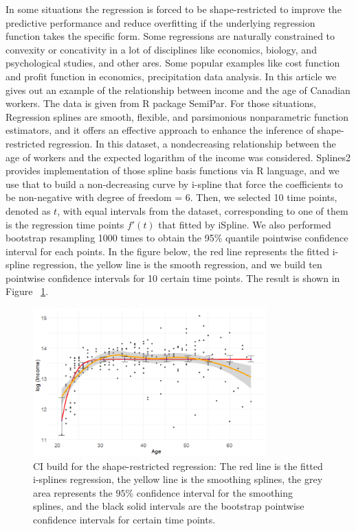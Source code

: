 \documentclass[12pt]{article}
\begin{document}
In some situations the regression is forced to be shape-restricted to improve the predictive performance and reduce overfitting if the underlying regression function takes the specific form. Some regressions are naturally constrained to convexity or concativity in a lot of disciplines like economics, biology, and psychological studies, and other ares.\cite{jieying2022heteroscedastic} \cite{guntuboyina2018nonparametric} Some popular examples like cost function and profit function in economics\cite{gallant1984imposing}, precipitation data analysis\cite{molitor2002bayesian}. In this article we gives out an example of the relationship between income and the age of Canadian workers. The data is given from R package SemiPar. For those situations, Regression splines are smooth, flexible, and parsimonious nonparametric function estimators, and it offers an effective approach to enhance the inference of shape-restricted regression. \cite{meyer2008inference} In this dataset, a nondecreasing relationship between the age of workers and the expected logarithm of the income was considered. \cite{wang2021shape}  Splines2 provides implementation of those spline basis functions via R language, and we use that to build a non-decreasing curve by i-spline that force the coefficients to be non-negative with degree of freedom = 6. Then, we selected 10 time points, denoted as $t$, with equal intervals from the dataset, corresponding to one of them is the regression time points \(f'(t)\) that fitted by iSpline. We also performed bootstrap resampling 1000 times to obtain the 95\% quantile pointwise confidence interval for each points. In the figure below, the red line represents the fitted i-spline regression, the yellow line is the smooth regression, and we build ten pointwise confidence intervals for 10 certain time points. The result is shown in Figure ~\ref{fig:semipar}.


\begin{figure}[H]
  \centering
  \includegraphics[width=0.8\textwidth]{SemiparCI.png}
  \caption{CI build for the shape-restricted regression: The red line is the fitted i-splines regression, the yellow line is the smoothing splines, the grey area represents the \(95\%\) confidence interval for the smoothing splines, and the black solid intervals are the bootstrap pointwise confidence intervals for certain time points. }
  \label{fig:semipar}
\end{figure}
\end{document}
